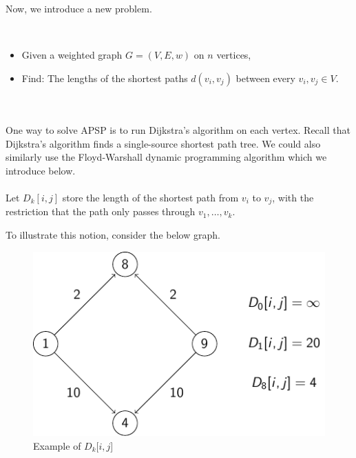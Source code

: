         Now, we introduce a new problem. 
        \begin{compprob} \label{prob:apsp}
            \vphantom
            \\
            \begin{itemize}
                \item Given a weighted graph \(G=(V,E,w)\) on \(n\) vertices,
                \item Find: The lengths of the shortest paths \(d(v_i,v_j)\) between every \(v_i,v_j\in V\).
            \end{itemize}
        \end{compprob}
        \vphantom
        \\
        \\
        One way to solve \textsc{APSP} is to run Dijkstra's algorithm on each vertex. Recall that Dijkstra's algorithm finds a single-source shortest path tree. We could also similarly use the Floyd-Warshall dynamic programming algorithm which we introduce below. 
        \\
        \\
        Let \(D_k[i,j]\) store the length of the shortest path from \(v_i\) to \(v_j\), with the restriction that the path only passes through \(v_1,\ldots,v_k\).
        \begin{example}
            To illustrate this notion, consider the below graph.
            \begin{figure}[H]
                \begin{center}
                    \includegraphics{Graphics/Figures/floyd_warshall/table_example.pdf}
                \end{center}
                \caption{Example of \(D_k[i,j\)]}
                \label{fig:example-floyd-warshall-table}
            \end{figure}
        \end{example}
